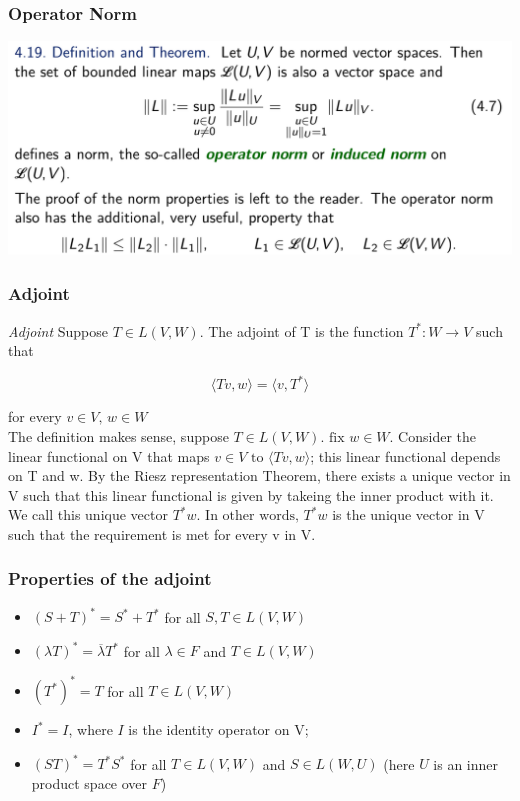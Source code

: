 \documentclass[12pt, t]{beamer}
\renewcommand{\emph}[1]{{\color{Turquoise3}\textsl{#1}}}
\newcommand{\nullspace}{~\\[15pt]}
\begin{document}
\begin{frame}
    \frametitle{Operator Norm}

    \includegraphics[width=\textwidth]{1}
\end{frame}

\begin{frame}
\frametitle{Adjoint}

\emph{Adjoint} Suppose $T\in L(V,W)$. The adjoint of T is the function $T^{*}: W \rightarrow V$ such that

\[
\langle Tv,w \rangle =\langle v, T^{*}  \rangle
\]

for every $v \in V\textrm{, } w\in W$
\nullspace
The definition makes sense, suppose $T \in L(V,W)\textrm{. fix }w \in W$. Consider the linear functional on V that maps $v \in V \textrm{ to } \langle Tv,w\rangle$; this linear functional depends on T and w. By the Riesz representation Theorem, there exists a unique vector in V such that this linear functional is given by takeing the inner product with it. We call this unique vector $T^{*}w\textrm{. In other words, }T^{*}w$ is the unique vector in V such that the requirement is met for every v in V.
\end{frame}



\begin{frame}
    \frametitle{Properties of the adjoint}
    \begin{itemize}
        \item $(S+T)^{*} =S^{*}+T^{*}$ for all $S,T \in L(V,W)$
        \item $(\lambda T)^{*} =\overline{\lambda} T^{*} $ for all $\lambda \in F$ and $T\in L(V,W)$
        \item $(T^{*})^{*}=T$ for all $T \in L(V,W)$
        \item $I^{*}=I$, where $I$ is the identity operator on V;
        \item $(ST)^{*} =T^{*}S^{*}$ for all $T \in L(V,W)$ and $S \in L(W,U)$ (here $U$ is an inner product space over $F$)
    \end{itemize}
   
\end{frame}
\end{document}
